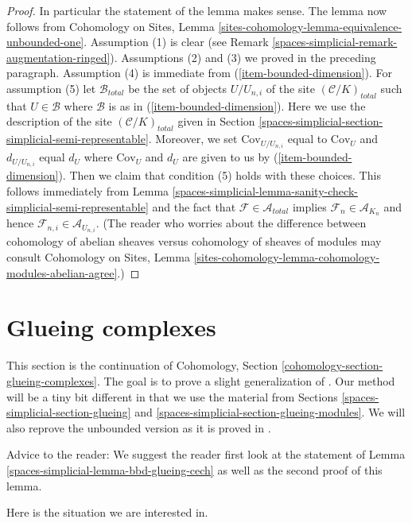 \begin{proof}
\medskip\noindent
In particular the statement of the lemma makes sense.
The lemma now follows from Cohomology on Sites,
Lemma \ref{sites-cohomology-lemma-equivalence-unbounded-one}.
Assumption (1) is clear (see Remark \ref{spaces-simplicial-remark-augmentation-ringed}).
Assumptions (2) and (3) we proved in the preceding paragraph.
Assumption (4) is immediate from (\ref{item-bounded-dimension}).
For assumption (5) let $\mathcal{B}_{total}$ be the set of
objects $U/U_{n, i}$ of the site $(\mathcal{C}/K)_{total}$
such that $U \in \mathcal{B}$ where $\mathcal{B}$ is as in
(\ref{item-bounded-dimension}). Here we use the description of
the site $(\mathcal{C}/K)_{total}$ given in
Section \ref{spaces-simplicial-section-simplicial-semi-representable}.
Moreover, we set $\text{Cov}_{U/U_{n, i}}$ equal to $\text{Cov}_U$
and $d_{U/U_{n, i}}$ equal $d_U$ where $\text{Cov}_U$ and $d_U$
are given to us by (\ref{item-bounded-dimension}).
Then we claim that condition (5) holds with these choices.
This follows immediately from
Lemma \ref{spaces-simplicial-lemma-sanity-check-simplicial-semi-representable}
and the fact that $\mathcal{F} \in \mathcal{A}_{total}$
implies $\mathcal{F}_n \in \mathcal{A}_{K_n}$ and hence
$\mathcal{F}_{n, i} \in \mathcal{A}_{U_{n, i}}$.
(The reader who worries about the difference between
cohomology of abelian sheaves versus cohomology
of sheaves of modules may consult Cohomology on Sites, Lemma
\ref{sites-cohomology-lemma-cohomology-modules-abelian-agree}.)
\end{proof}

\section{Glueing complexes}
\label{spaces-simplicial-section-glueing-complexes}
This section is the continuation of
Cohomology, Section \ref{cohomology-section-glueing-complexes}.
The goal is to prove a slight generalization of \cite[Theorem 3.2.4]{BBD}.
Our method will be a tiny bit different in that we use
the material from Sections \ref{spaces-simplicial-section-glueing} and
\ref{spaces-simplicial-section-glueing-modules}. We will also reprove the
unbounded version as it is proved in \cite{six-I}.

\medskip\noindent
Advice to the reader: We suggest the reader first look at the statement of
Lemma \ref{spaces-simplicial-lemma-bbd-glueing-cech} as well as the second proof of this lemma.

\medskip\noindent
Here is the situation we are interested in.

